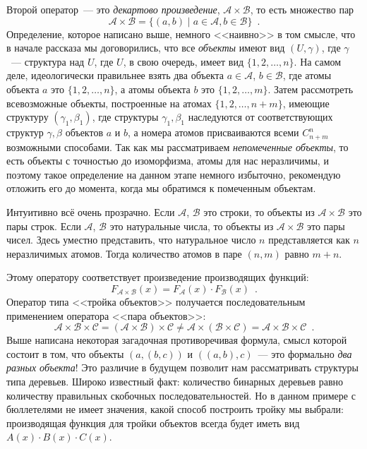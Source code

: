 \documentclass{article}
\theoremstyle{definition}
\begin{document}
Второй оператор~--- это \textit{декартово произведение}, \( \mathcal A \times 
\mathcal B \), то 
есть множество пар
\[
	\mathcal A \times \mathcal B = \{ (a, b) \mid a \in \mathcal A, b \in 
	\mathcal B \} \enspace .
\]
Определение, которое написано выше, немного <<наивно>> в том смысле, что в 
начале рассказа мы договорились, что все \textit{объекты} имеют вид \( (U, 
\gamma) \), где \( \gamma \)~--- структура над \( U \), где \( U \), в свою 
очередь, имеет вид \( \{ 1, 2, \ldots, n \} \). На самом деле, идеологически 
правильнее взять два объекта \( a \in \mathcal A \), \( b \in \mathcal B \), 
где атомы объекта \( a \) это \( \{ 1, 2, \ldots, n \} \), а атомы объекта \( b 
\) это \( \{1,2,\ldots, m  \} \). Затем рассмотреть всевозможные объекты, 
построенные на атомах \( \{ 1, 2, \ldots, n+m \} \), имеющие структуру \( 
(\gamma_1, \beta_1) \), где структуры \( \gamma_1, \beta_1 \) наследуются от  
соответствующих структур \( \gamma, \beta \) объектов \( a \) и \( b \), а 
номера атомов присваиваются всеми \( 
C_{n+m}^{n} \) возможными способами. Так как мы рассматриваем 
\textit{непомеченные объекты}, то есть объекты с точностью до изоморфизма, 
атомы для нас неразличимы, и поэтому такое определение на данном этапе немного 
избыточно, рекомендую отложить его до момента, когда мы обратимся к помеченным 
объектам.

Интуитивно всё очень прозрачно. Если \( \mathcal A \), \( \mathcal B \) это 
строки, то объекты из \( \mathcal A \times \mathcal B \) это пары строк. Если 
\( \mathcal A \), \( \mathcal B \) это натуральные числа, то объекты из \( 
\mathcal A \times \mathcal B \) это пары чисел. Здесь уместно представить, что 
натуральное число \( n \) представляется как \( n \) неразличимых атомов. Тогда 
количество атомов в паре \( (n, m) \) равно \( m + n \).

Этому оператору 
соответствует произведение 
производящих функций:
\[
	F_{\mathcal A \times \mathcal B}(x) = F_{\mathcal A}(x) \cdot F_{\mathcal 
	B}(x) \enspace.
\]
Оператор типа <<тройка объектов>> получается последовательным применением 
оператора <<пара объектов>>:
\[
	\mathcal A \times \mathcal B \times \mathcal C = (\mathcal A \times 
	\mathcal B) \times \mathcal C \neq \mathcal A \times (\mathcal B \times 
	\mathcal C) = \mathcal A 
	\times \mathcal B \times \mathcal C
	\enspace .
\]
Выше написана некоторая загадочная противоречивая формула, смысл которой 
состоит в том, что объекты \( (a, (b, c)) \) и \( ((a, b), c) \)~--- это 
формально \textit{два разных объекта}! Это различие в будущем позволит нам 
рассматривать структуры типа деревьев. Широко известный факт: количество 
бинарных деревьев равно количеству правильных скобочных последовательностей. Но 
в данном примере с бюллетелями не имеет значения, какой способ построить тройку 
мы выбрали: производящая функция для тройки объектов всегда будет иметь вид \( 
A(x) \cdot B(x) \cdot C(x) \).
\end{document}
